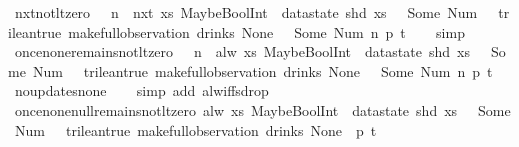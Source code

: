 \begin{isabellebody}
\ nxt{\isacharunderscore}not{\isacharunderscore}lt{\isacharunderscore}zero{\isacharcolon}\ {\isachardoublequoteopen}{}\ {\isasymle}\ n\ {\isasymLongrightarrow}\ nxt\ {\isacharparenleft}{\isasymlambda}xs{\isachardot}\ MaybeBoolInt\ {\isacharparenleft}{\isacharless}{\isacharparenright}\ {\isacharparenleft}datastate\ {\isacharparenleft}shd\ xs{\isacharparenright}\ {\isachardollar}\ {}{\isacharparenright}\ {\isacharparenleft}Some\ {\isacharparenleft}Num\ {}{\isacharparenright}{\isacharparenright}\ {\isasymnoteq}\ trilean{\isachardot}true{\isacharparenright}\ {\isacharparenleft}make{\isacharunderscore}full{\isacharunderscore}observation\ drinks\ None\ {\isacharless}{}\ {\isachardollar}{\isacharcolon}{\isacharequal}\ Some\ {\isacharparenleft}Num\ n{\isacharparenright}{\isachargreater}\ p\ t{\isacharparenright}{\isachardoublequoteclose}\isanewline
%
\isadelimproof
\ \ %
\endisadelimproof
%
\isatagproof
{}\isamarkupfalse%
\ simp%
\endisatagproof
{\isafoldproof}%
%
\isadelimproof
\isanewline
%
\endisadelimproof
\isanewline
{}\isamarkupfalse%
\ once{\isacharunderscore}none{\isacharunderscore}remains{\isacharunderscore}not{\isacharunderscore}lt{\isacharunderscore}zero{\isacharcolon}\ {\isachardoublequoteopen}{}\ {\isasymle}\ n\ {\isasymLongrightarrow}\ alw\ {\isacharparenleft}{\isasymlambda}xs{\isachardot}\ MaybeBoolInt\ {\isacharparenleft}{\isacharless}{\isacharparenright}\ {\isacharparenleft}datastate\ {\isacharparenleft}shd\ xs{\isacharparenright}\ {\isachardollar}\ {}{\isacharparenright}\ {\isacharparenleft}Some\ {\isacharparenleft}Num\ {}{\isacharparenright}{\isacharparenright}\ {\isasymnoteq}\ trilean{\isachardot}true{\isacharparenright}\ {\isacharparenleft}make{\isacharunderscore}full{\isacharunderscore}observation\ drinks\ None\ {\isacharless}{}\ {\isachardollar}{\isacharcolon}{\isacharequal}\ Some\ {\isacharparenleft}Num\ n{\isacharparenright}{\isachargreater}\ p\ t{\isacharparenright}{\isachardoublequoteclose}\isanewline
%
\isadelimproof
\ \ %
\endisadelimproof
%
\isatagproof
{}\isamarkupfalse%
\ no{\isacharunderscore}updates{\isacharunderscore}none\isanewline
\ \ \isamarkupfalse%
\ {\isacharparenleft}simp\ add{\isacharcolon}\ alw{\isacharunderscore}iff{\isacharunderscore}sdrop{\isacharparenright}%
\endisatagproof
{\isafoldproof}%
%
\isadelimproof
\isanewline
%
\endisadelimproof
\isanewline
{}\isamarkupfalse%
\ once{\isacharunderscore}none{\isacharunderscore}null{\isacharunderscore}remains{\isacharunderscore}not{\isacharunderscore}lt{\isacharunderscore}zero{\isacharcolon}\ {\isachardoublequoteopen}alw\ {\isacharparenleft}{\isasymlambda}xs{\isachardot}\ MaybeBoolInt\ {\isacharparenleft}{\isacharless}{\isacharparenright}\ {\isacharparenleft}datastate\ {\isacharparenleft}shd\ xs{\isacharparenright}\ {\isachardollar}\ {}{\isacharparenright}\ {\isacharparenleft}Some\ {\isacharparenleft}Num\ {}{\isacharparenright}{\isacharparenright}\ {\isasymnoteq}\ trilean{\isachardot}true{\isacharparenright}\ {\isacharparenleft}make{\isacharunderscore}full{\isacharunderscore}observation\ drinks\ None\ {\isacharless}{\isachargreater}\ p\ t{\isacharparenright}{\isachardoublequoteclose}\isanewline

\end{isabellebody}
